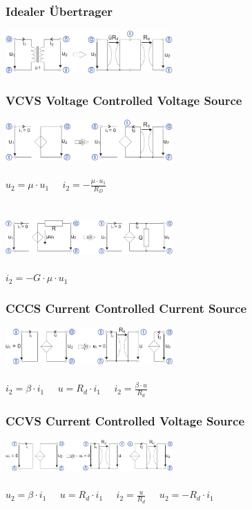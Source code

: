 \documentclass[a4paper,twocolumn,10pt]{article}
\begin{document}
\subsubsection*{Idealer Übertrager}
\includegraphics[width=0.48\textwidth]{img/KSA_Uebertrager}
\subsubsection*{VCVS Voltage Controlled Voltage Source}
\includegraphics[width=0.48\textwidth]{img/KSA_USU}\\\\
$u_2=\mu \cdot u_1\;\;\;\;\;i_2=-\frac{\mu \cdot u_1}{R_D}$\\\\\\
\includegraphics[width=0.48\textwidth]{img/KSA_USU2}\\\\
$i_2=-G\cdot \mu\cdot u_1$
\subsubsection*{CCCS Current Controlled Current Source}
\includegraphics[width=0.48\textwidth]{img/KSA_ISI}\\\\
$i_2=\beta \cdot i_1\;\;\;\;\;u=R_d\cdot i_1\;\;\;\;\;i_2=\frac{\beta \cdot u}{R_d}$
\subsubsection*{CCVS Current Controlled Voltage Source}
\includegraphics[width=0.48\textwidth]{img/KSA_ISU}\\\\
$u_2=\beta \cdot i_1\;\;\;\;\;u=R_d\cdot i_1\;\;\;\;\;i_2=\frac{u}{R_d}\;\;\;\;\;u_2=-R_d\cdot i_1$
\end{document}
